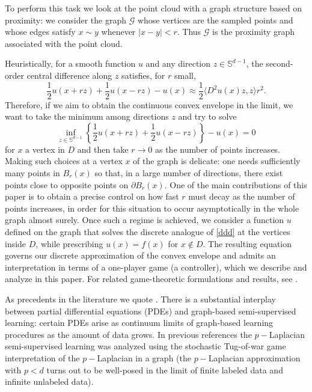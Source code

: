 \documentclass[11pt]{amsart}
\theoremstyle{definition}
\theoremstyle{remark}
\numberwithin{equation}{section}
\newcommand{\G}{\mathcal{G}}
\begin{document}
	
	To perform this task we look at the point cloud with a graph structure based on proximity: we consider the graph $\G$ whose vertices are the sampled points and whose edges satisfy $x\sim y$ whenever $|x-y|<r$. Thus $\G$ is the proximity graph associated with the point cloud.

Heuristically, for a smooth function $u$ and any direction $z\in\mathbb{S}^{d-1}$, the second-order central difference along $z$ satisfies, for $r$ small,
	\[
	\frac12 u(x+rz) + \frac12 u(x-rz) - u(x) \approx \frac12 \langle D^2 u(x) z, z \rangle r^2.
	\]
Therefore, if we aim to obtain the continuous convex envelope in the limit, we want to take
the minimum among directions $z$ and try to solve
\begin{equation}
\label{ddd}
\inf_{z\in\mathbb{S}^{d-1}} \left\{ \frac12 u(x+rz) + \frac12 u(x-rz) \right \} - u(x) = 0
\end{equation}	
for $x$ a vertex in $D$ and then take $r \to 0$ as the number of points increases. 
	Making such choices at a vertex $x$ of the graph is delicate: one needs sufficiently many points in $B_r(x)$ so that, in a large number of directions, there exist points close to opposite points on $\partial B_r(x)$. 
	One of the main contributions of this paper is to obtain a precise control on how fast $r$ must decay as the number of points increases, in order for this situation to occur asymptotically in the whole graph almost surely.
	Once such a regime is achieved, we consider a function $u$ defined on the graph that solves the discrete analogue of \eqref{ddd} at the vertices inside $D$, while prescribing $u(x)=f(x)$ for $x\notin D$. The resulting equation governs our discrete approximation of the convex envelope and admits an interpretation in terms of a one-player game (a controller), which we describe and analyze in this paper. For related game-theoretic formulations and results, see \cite{BlancRossi,Blanc-Rossi,Lewicka,MPR,PSSW}.

	As precedents in the literature we quote \cite{Arroyo,Bun,Cal1,Cal2,Cal3,Cal4,Cal5}. 
There is a substantial interplay between partial differential equations (PDEs) and graph-based semi-supervised learning: certain PDEs arise as continuum limits of graph-based learning procedures as the amount of data grows.
In previous references the $p-$Laplacian semi-supervised learning was analyzed 
using the stochastic Tug-of-war game interpretation of the $p-$Laplacian in a graph
(the $p-$Laplacian approximation with $p<d$ turns out to be well-posed in the limit of finite labeled data and infinite unlabeled data).
\end{document}
